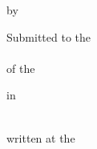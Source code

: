 \begin{titlepage}

	\begin{addmargin}{-3cm} %
	\begin{center}
		
		\vfill
		\hfill
		\vfill
		
		\begingroup
			\huge\spacedlowsmallcaps{\myTitle}
			
			\bigskip
			\bigskip
			\bigskip
			\bigskip
			\bigskip
			
			{
				\huge\spacedallcaps{\mySubtitle}
			\par}
			
		
		\endgroup
		
		\bigskip
		\bigskip
		
		by \\
		\medskip
		\spacedlowsmallcaps{\Large\myName}

		\vfill
		\vfill


		\vfill
		
		Submitted to the\\
		\spacedlowsmallcaps{\myFaculty} \\
		of the \myUni \\
		
		\bigskip
		\bigskip
		
		in \\
		\myTime\\ %
		
		\bigskip
		\bigskip
		\bigskip
		
		written at the \\
		\myDepartment \\
		\myLocation


		\end{center}
	\end{addmargin}
\end{titlepage}